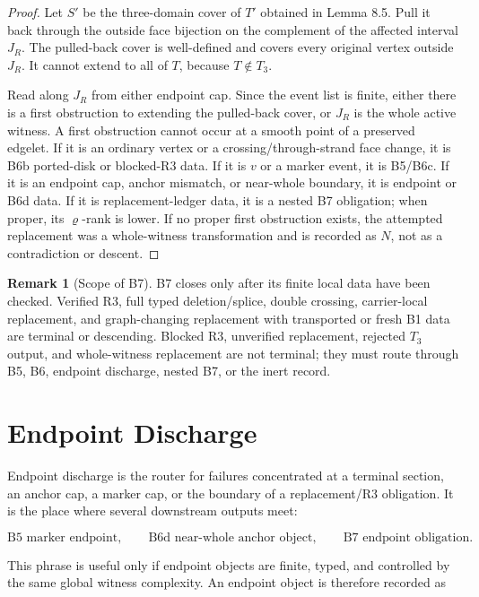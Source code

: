 \documentclass[11pt]{amsart}
\theoremstyle{definition}
\newtheorem{remark}[theorem]{Remark}
\begin{document}
\begin{proof}
Let \(S'\) be the three-domain cover of \(T'\) obtained in Lemma 8.5. Pull it back through the outside face bijection on the complement of the affected interval \(J_R\). The pulled-back cover is well-defined and covers every original vertex outside \(J_R\). It cannot extend to all of \(T\), because \(T\notin T_3\).

Read along \(J_R\) from either endpoint cap. Since the event list is finite, either there is a first obstruction to extending the pulled-back cover, or \(J_R\) is the whole active witness. A first obstruction cannot occur at a smooth point of a preserved edgelet. If it is an ordinary vertex or a crossing/through-strand face change, it is B6b ported-disk or blocked-R3 data. If it is \(v\) or a marker event, it is B5/B6c. If it is an endpoint cap, anchor mismatch, or near-whole boundary, it is endpoint or B6d data. If it is replacement-ledger data, it is a nested B7 obligation; when proper, its \(\varrho\)-rank is lower. If no proper first obstruction exists, the attempted replacement was a whole-witness transformation and is recorded as \(N\), not as a contradiction or descent.

\end{proof}
\begin{remark}[Scope of B7]
B7 closes only after its finite local data have
been checked. Verified R3, full typed deletion/splice, double crossing,
carrier-local replacement, and graph-changing replacement with transported or
fresh B1 data are terminal or descending. Blocked R3, unverified replacement,
rejected \(T_3\) output, and whole-witness replacement are not terminal; they must
route through B5, B6, endpoint discharge, nested B7, or the inert record.

\end{remark}
\section{Endpoint Discharge}

Endpoint discharge is the router for failures concentrated at a terminal section,
an anchor cap, a marker cap, or the boundary of a replacement/R3 obligation. It
is the place where several downstream outputs meet:

\[
\text{B5 marker endpoint},\qquad
\text{B6d near-whole anchor object},\qquad
\text{B7 endpoint obligation}.
\]

This phrase is useful only if endpoint objects are finite, typed, and controlled
by the same global witness complexity. An endpoint object is therefore recorded
as
\end{document}
